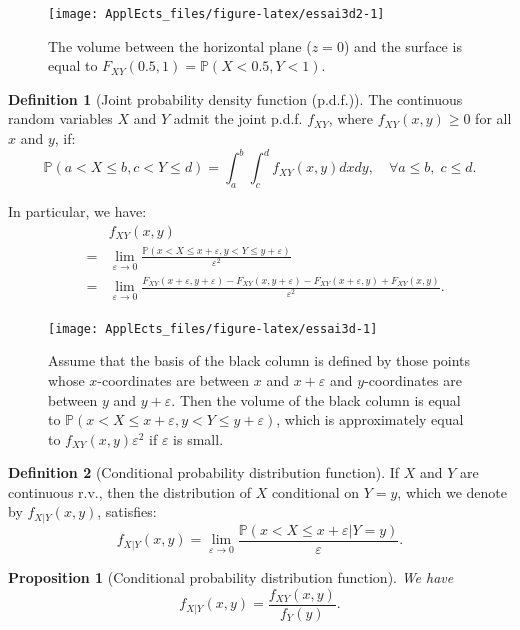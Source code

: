 \documentclass[
  12pt,
]{book}
\newtheorem{proposition}{Proposition}[chapter]
\theoremstyle{definition}
\newtheorem{definition}{Definition}[chapter]
\theoremstyle{definition}
\theoremstyle{definition}
\theoremstyle{definition}
\theoremstyle{remark}
\begin{document}
\begin{figure}
\texttt{[image: ApplEcts\_files/figure-latex/essai3d2-1]} \caption{The volume between the horizontal plane ($z=0$) and the surface is equal to $F_{XY}(0.5,1)=\mathbb{P}(X<0.5,Y<1)$.}\label{fig:essai3d2}
\end{figure}

\begin{definition}[Joint probability density function (p.d.f.)]
\protect\hypertarget{def:jointpdf}{}\label{def:jointpdf}The continuous random variables \(X\) and \(Y\) admit the joint p.d.f. \(f_{XY}\), where \(f_{XY}(x,y) \ge 0\) for all \(x\) and \(y\), if:
\[
\mathbb{P}(a < X \le b,c < Y \le d) = \int_{a}^{b}\int_{c}^{d}f_{XY}(x,y)dx dy, \quad \forall a \le b,\;c \le d.
\]
\end{definition}

In particular, we have:
\begin{eqnarray*}
&&f_{XY}(x,y)\\
&=& \lim_{\varepsilon \rightarrow 0} \frac{\mathbb{P}(x < X \le x + \varepsilon,y < Y \le y + \varepsilon)}{\varepsilon^2} \\
&=& \lim_{\varepsilon \rightarrow 0} \frac{F_{XY}(x + \varepsilon,y + \varepsilon)-F_{XY}(x,y + \varepsilon)-F_{XY}(x + \varepsilon,y)+F_{XY}(x,y)}{\varepsilon^2}.
\end{eqnarray*}

\begin{figure}
\texttt{[image: ApplEcts\_files/figure-latex/essai3d-1]} \caption{Assume that the basis of the black column is defined by those points whose $x$-coordinates are between $x$ and $x+\varepsilon$ and $y$-coordinates are between $y$ and $y+\varepsilon$. Then the volume of the black column is equal to $\mathbb{P}(x < X \le x+\varepsilon,y < Y \le y+\varepsilon)$, which is approximately equal to $f_{XY}(x,y)\varepsilon^2$ if $\varepsilon$ is small.}\label{fig:essai3d}
\end{figure}

\begin{definition}[Conditional probability distribution function]
\protect\hypertarget{def:condcdf}{}\label{def:condcdf}If \(X\) and \(Y\) are continuous r.v., then the distribution of \(X\) conditional on \(Y=y\), which we denote by \(f_{X|Y}(x,y)\), satisfies:
\[
f_{X|Y}(x,y)=\lim_{\varepsilon \rightarrow 0} \frac{\mathbb{P}(x < X \le x + \varepsilon|Y=y)}{\varepsilon}.
\]
\end{definition}

\begin{proposition}[Conditional probability distribution function]
\protect\hypertarget{prp:condcdf}{}\label{prp:condcdf}We have
\[
f_{X|Y}(x,y)=\frac{f_{XY}(x,y)}{f_Y(y)}.
\]
\end{proposition}
\end{document}
